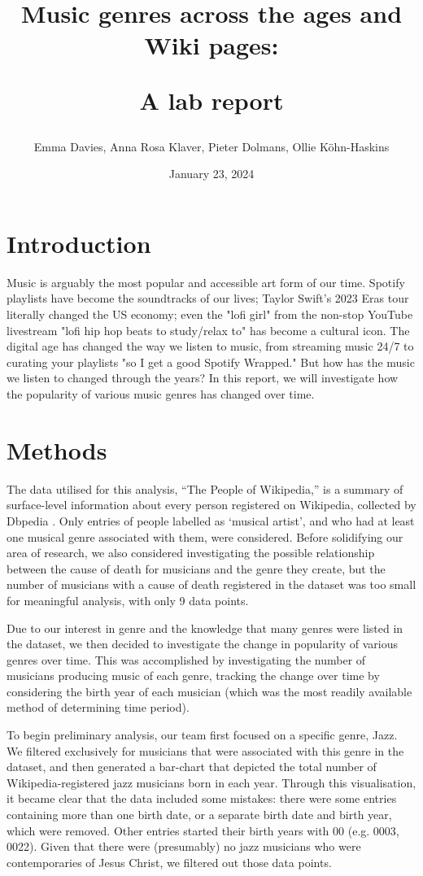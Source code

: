 \documentclass{article}
\title{Music genres across the ages and Wiki pages:

A lab report}
\author{Emma Davies, Anna Rosa Klaver, Pieter Dolmans, Ollie Köhn-Haskins}
\date{January 23, 2024}
\begin{document}
\maketitle

\section{Introduction}
Music is arguably the most popular and accessible art form of our time. Spotify playlists have become the soundtracks of our lives; Taylor Swift's 2023 Eras tour literally changed the US economy; even the "lofi girl" from the non-stop YouTube livestream "lofi hip hop beats to study/relax to" has become a cultural icon. The digital age has changed the way we listen to music, from streaming music 24/7 to curating your playlists "so I get a good Spotify Wrapped." But how has the music we listen to changed through the years? In this report, we will investigate how the popularity of various music genres has changed over time.

\section{Methods}

The data utilised for this analysis, “The People of Wikipedia,” is a summary of surface-level information about every person registered on Wikipedia, collected by Dbpedia \cite{lehmann2015dbpedia}. Only entries of people labelled as ‘musical artist’, and who had at least one musical genre associated with them, were considered. Before solidifying our area of research, we also considered investigating the possible relationship between the cause of death for musicians and the genre they create, but the number of musicians with a cause of death registered in the dataset was too small for meaningful analysis, with only 9 data points.

Due to our interest in genre and the knowledge that many genres were listed in the dataset, we then decided to investigate the change in popularity of various genres over time. This was accomplished by investigating the number of musicians producing music of each genre, tracking the change over time by considering the birth year of each musician (which was the most readily available method of determining time period).

To begin preliminary analysis, our team first focused on a specific genre, Jazz. We filtered exclusively for musicians that were associated with this genre in the dataset, and then generated a bar-chart that depicted the total number of Wikipedia-registered jazz musicians born in each year. Through this visualisation, it became clear that the data included some mistakes: there were some entries containing more than one birth date, or a separate birth date and birth year, which were removed. Other entries started their birth years with 00 (e.g. 0003, 0022). Given that there were (presumably) no jazz musicians who were contemporaries of Jesus Christ, we filtered out those data points. 
\end{document}
